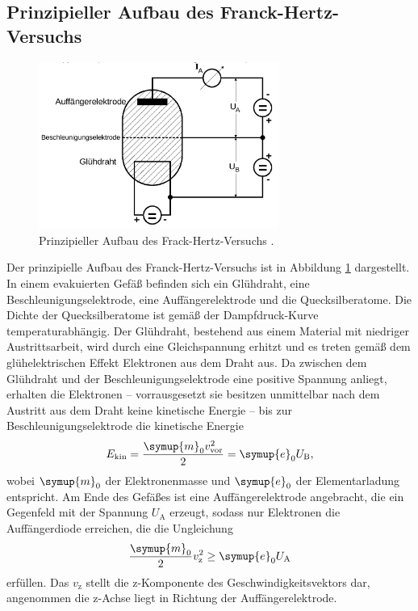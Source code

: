 \subsection{Prinzipieller Aufbau des Franck-Hertz-Versuchs}
\begin{figure}
  \centering
  \includegraphics[width=0.7\textwidth]{Bilder/aufbau.png}
  \caption{Prinzipieller Aufbau des Frack-Hertz-Versuchs \cite{Anleitung}.}
  \label{fig:franckhertztheory}
\end{figure}
Der prinzipielle Aufbau des Franck-Hertz-Versuchs ist in Abbildung \ref{fig:franckhertztheory}
dargestellt.
In einem evakuierten Gefäß befinden sich ein Glühdraht, eine Beschleunigungselektrode, eine
Auffängerelektrode und die Quecksilberatome.
Die Dichte der Quecksilberatome ist gemäß der Dampfdruck-Kurve temperaturabhängig.
Der Glühdraht, bestehend aus einem Material mit niedriger Austrittsarbeit, wird durch eine
Gleichspannung erhitzt und es treten gemäß dem glühelektrischen Effekt Elektronen
aus dem Draht aus.
Da zwischen dem Glühdraht und der Beschleunigungselektrode eine positive Spannung anliegt,
erhalten die Elektronen -- vorrausgesetzt sie besitzen unmittelbar nach dem Austritt aus dem
Draht keine kinetische Energie -- bis zur Beschleunigungselektrode die kinetische Energie
\begin{equation}
	E_{\mathrm{kin}} = \frac{\symup{m}_0 v_{\mathrm{vor}}^2}{2} = \symup{e}_0 U_{\mathrm{B}} \mathrm{,}
\end{equation}
wobei $\symup{m}_0$ der Elektronenmasse und $\symup{e}_0$ der Elementarladung entspricht.
Am Ende des Gefäßes ist eine Auffängerelektrode angebracht, die ein Gegenfeld mit der Spannung
$U_{\mathrm{A}}$ erzeugt, sodass nur Elektronen die Auffängerdiode erreichen, die die
Ungleichung
\begin{equation}
	\frac{\symup{m}_0}{2} v_{\mathrm{z}}^2 \geq \symup{e}_0 U_{\mathrm{A}}
\end{equation}
erfüllen. Das $v_{\mathrm{z}}$ stellt die z-Komponente des Geschwindigkeitsvektors dar,
angenommen die z-Achse liegt in Richtung der Auffängerelektrode.

